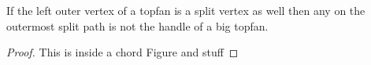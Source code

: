       \begin{lemma}
        \label{lm:uni:NoTwoSplitsAboveEachOther}
        If the left outer vertex of a topfan is a split vertex as well then any on the outermost split path is not the handle of a big topfan.
      \end{lemma}

      \begin{proof}
        This is inside a chord Figure and stuff
      \end{proof}
